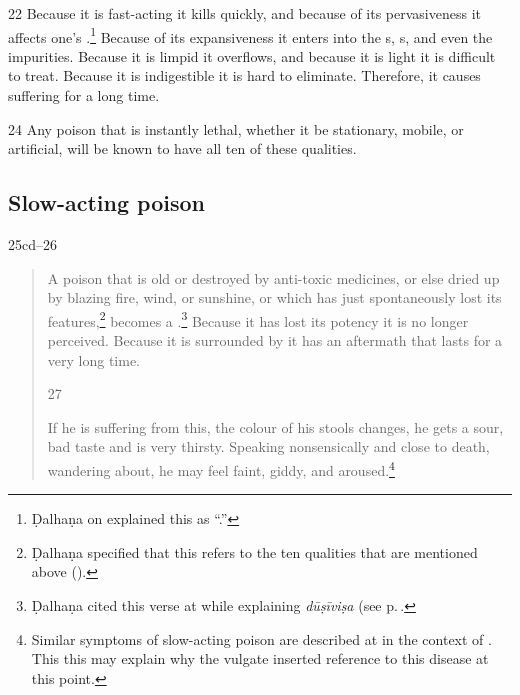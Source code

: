 \begin{translation}
\item[22]
Because it is fast-acting it kills quickly, and because of its pervasiveness
it affects one's .\footnote{Ḍalhaṇa
on  explained this as “.”}  Because of its expansiveness it enters
into the s, s, and even the
impurities.  Because it is limpid it overflows, and
because it is light it is difficult to treat.  Because it is indigestible it
is hard to eliminate.  Therefore, it causes suffering for a long time.
    
    \item[ 24]
    Any poison that is instantly lethal, whether it be
    stationary, mobile, or artificial, will be known to 
    have all ten of these qualities.
    
    
  
    
    \subsection{Slow-acting poison}
    \item[25cd--26]  
    \begin{verse}
        A poison that is old or destroyed by anti-toxic medicines, or
else dried up by blazing fire, wind, or sunshine, or which has
just spontaneously lost its features,\footnote{Ḍalhaṇa
    specified that this refers to the ten qualities that are
    mentioned above ().} becomes a
    .\footnote{Ḍalhaṇa cited
        this verse at  while explaining
        \emph{dūṣīviṣa} (see p.\,\pageref{dusivisa}.} Because it has
        lost its potency it is no longer perceived.  Because it is
        surrounded by  it has an aftermath that
        lasts for a very long time.
        
        \item[27] 
        
If he is suffering from this, the colour of his stools changes, he
gets a sour, bad taste and is very thirsty. Speaking nonsensically and
close to death, wandering about, he may feel faint, giddy, and
aroused.\footnote{Similar symptoms of slow-acting poison are described
    at  in the context of 
    .  This this may explain why the
    vulgate inserted reference to this disease at this point.}
        

\end{verse}
\end{translation}
